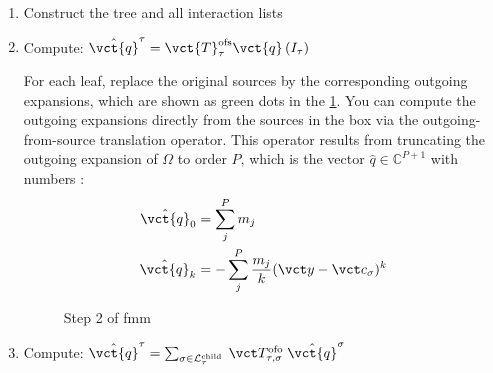 \begin{enumerate}
  \item Construct the tree and all interaction lists
  \item Compute: $\hat{\vct{q}}^{\tau}=\vct{T}_{\tau}^{\mathrm{ofs}} \vct{q}\left(I_{\tau}\right)$

  For each leaf, replace the original sources by the corresponding outgoing expansions, which are shown as green dots in the \cref{fig:step2}.
  You can compute the outgoing expansions directly from the sources in the box via the outgoing-from-source translation operator.
  This operator results from truncating the outgoing expansion of $\Omega$ to order $P$, which is the vector $\hat{q} \in \mathbb{C}^{P+1}$ with numbers \cite{Martinsson2015}:
  \begin{equation}
    \begin{split}
      \hat{\vct{q}}_0 &= \sum_j^P m_j \\
      \hat{\vct{q}}_k &= - \sum_j^P \frac{m_j}{k} (\vct y - \vct c_\sigma)^k
    \end{split}
  \end{equation}
  \begin{figure}
    \centering
    \hspace{1em}
    \caption{Step 2 of \gls{fmm}}
    \label{fig:step2}
  \end{figure}

  \item Compute: $\hat{\vct{q}}^{\tau}=\sum_{\sigma \in \mathcal{L}_{\tau}^{\text {child }}} \vct T_{\tau, \sigma}^{\text {ofo }} \hat{\vct{q}}^{\sigma}$


\end{enumerate}
